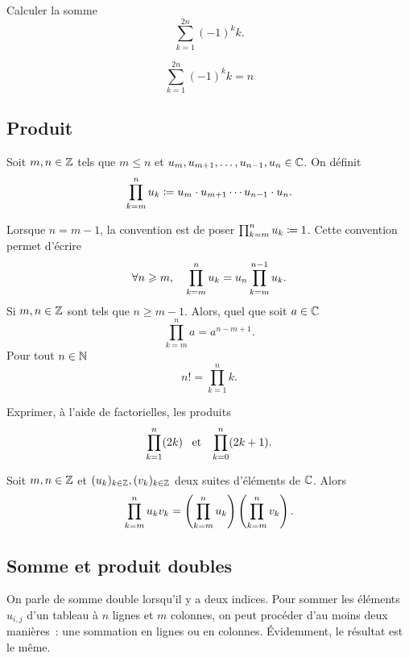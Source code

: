 \documentclass{magnolia}
\begin{document}
\begin{exoUnique}
\exo Calculer la somme
  \[\sum_{k=1}^{2n} (-1)^k k.\]
  \begin{sol}
\[\sum_{k=1}^{2n} (-1)^k k=n\]
  \end{sol}
\end{exoUnique}


\subsection{Produit}

\begin{definition}[utile=-3]
Soit $m,n\in\mathbb{Z}$ tels que $m\leq n$ et $u_{m},u_{m+1},\ldots,u_{n-1},u_n\in\mathbb{C}$. On
définit
\[\prod_{k=m}^n u_k\coloneqq u_{m}\cdot u_{m+1}\cdots u_{n-1}\cdot u_n.\]
\end{definition}

\begin{remarques}
\remarque Lorsque $n=m-1$, la convention est de poser $\prod_{k=m}^n u_k\coloneqq 1$. Cette
  convention permet d'écrire
  \[\forall n\geqslant m,\quad \prod_{k=m}^n u_k = u_n  \prod_{k=m}^{n-1} u_k.\]
\remarque Si $m,n\in\mathbb{Z}$ sont tels que $n\geq m-1$. Alors, quel que soit $a\in\mathbb{C}$
  \[\prod_{k=m}^{n} a =a^{n-m+1}.\]
\remarque Pour tout $n\in\mathbb{N}$
   \[n!=\prod_{k=1}^n k.\]
\end{remarques}

\begin{exoUnique}
\exo Exprimer, à l'aide de factorielles, les produits
  \[\prod_{k=1}^n (2k) \quad\!\text{et}\quad\! \prod_{k=0}^n (2k+1).\]
\end{exoUnique}

\begin{proposition}
Soit $m,n\in\mathbb{Z}$ et $(u_k)_{k\in\mathbb{Z}}, (v_k)_{k\in\mathbb{Z}}$ deux suites d'éléments de $\mathbb{C}$. Alors
\[\prod_{k=m}^n u_k v_k=\left(\prod_{k=m}^n u_k\right) \left(\prod_{k=m}^n v_k\right).\]
\end{proposition}

\subsection{Somme et produit doubles}

On parle de somme double lorsqu'il y a deux indices. Pour sommer les éléments
$u_{i,j}$ d'un tableau à $n$ lignes et $m$ colonnes, on peut procéder d'au
moins deux manières~: une sommation en lignes ou en colonnes. Évidemment, le résultat est le même. 
\end{document}
